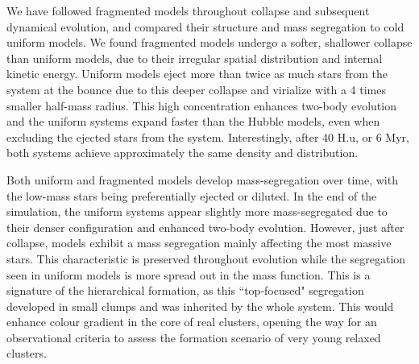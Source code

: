 We have followed \HubLem fragmented models throughout collapse and subsequent dynamical evolution, and compared their structure and mass segregation to cold uniform models. We found fragmented models undergo a softer, shallower collapse than uniform models, due to their irregular spatial distribution and internal kinetic energy. Uniform models eject more than twice as much stars from the system at the bounce due to this deeper collapse and virialize with a 4 times smaller half-mass radius. This high concentration enhances two-body evolution and the uniform systems expand faster than the Hubble models, even when excluding the ejected stars from the system. Interestingly, after 40 H.u, or 6 Myr, both systems achieve approximately the same density and distribution.

Both uniform and fragmented models develop mass-segregation over time, with the low-mass stars being preferentially ejected or diluted. In the end of the simulation, the uniform systems appear slightly more mass-segregated due to their denser configuration and enhanced two-body evolution. However, just after collapse, \HubLem models exhibit a mass segregation mainly affecting the most massive stars. This characteristic is preserved throughout evolution while the segregation seen in uniform models is more spread out in the mass function. This is  a signature of the hierarchical formation, as this ``top-focused" segregation developed in small clumps and was inherited by the whole system. This would enhance colour gradient in the core of real clusters, opening the way for an observational criteria to assess the formation scenario of very young relaxed clusters.






